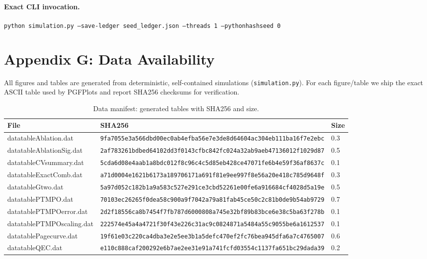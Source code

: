 \documentclass[a4paper,11pt]{article}
\theoremstyle{plain}
\theoremstyle{definition}
\theoremstyle{remark}
\begin{document}
\paragraph{Exact CLI invocation.}
\texttt{python simulation.py --save-ledger seed\_ledger.json --threads 1 --pythonhashseed 0}

\section{Appendix G: Data Availability}
\label{app:data}
All figures and tables are generated from deterministic, self-contained simulations (\texttt{simulation.py}).
For each figure/table we ship the exact ASCII table used by PGFPlots and report SHA256 checksums for verification.

\begin{table}[t]
\centering
\caption{Data manifest: generated tables with SHA256 and size.}
\label{tab:datamanifest}
\scriptsize
\begin{tabular}{@{}lp{42em}l@{}}
\toprule
File & SHA256 & Size \\
\midrule
datatableAblation.dat & \texttt{9fa7055e3a566dbd00ec0ab4efba56e7e3de8d64604ac304eb111ba16f7e2ebc} & 0.3 \\
datatableAblationSig.dat & \texttt{2af783261bdbed64102dd3f0143cfbc842fc024a32ab9aeb47136012f1029d87} & 0.5 \\
datatableCVsummary.dat & \texttt{5cda6d08e4aab1a8bdc012f8c96c4c5d85eb428ce47071fe6b4e59f36af8637c} & 0.1 \\
datatableExactComb.dat & \texttt{a71d0004e1621b6173a189706171a691f81e9ee997f8e56a20e418c785d9648f} & 0.3 \\
datatableGtwo.dat & \texttt{5a97d052c182b1a9a583c527e291ce3cbd52261e00fe6a916684cf4028d5a19e} & 0.5 \\
datatablePTMPO.dat & \texttt{70103ec26265f0dea58c900a9f7042a79a81fab45ce50c2c81b0de9b54ab9729} & 0.7 \\
datatablePTMPOerror.dat & \texttt{2d2f18556ca8b7454f7fb787d6000808a745e32bf89b83bce6e38c5ba63f278b} & 0.1 \\
datatablePTMPOscaling.dat & \texttt{222574e45a4a4721f30f43e226c31ac9c0824871a5484a55c9055be6a1612537} & 0.1 \\
datatablePagecurve.dat & \texttt{19f61e03c220ca4dba3e2e5ee3b1a5defc470ef2fc76bea945dfa6a7c4765007} & 0.6 \\
datatableQEC.dat & \texttt{e110c888caf200292e6b7ae2ee31e91a741fcfd03554c1137fa651bc29dada39} & 0.2 \\
\bottomrule
\end{tabular}
\end{table}
\end{document}
